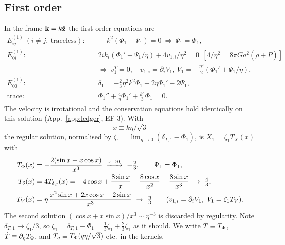 \subsection{First order}
\label{sec:first}
In the frame $\mathbf k=k\hat{\mathbf z}$ the first-order equations are
\begin{align}
E^{(1)}_{ij}\ (i\neq j,\ \text{traceless}):&\quad -k^2(\Phi_1-\Psi_1)=0\ \Rightarrow\ \Psi_1=\Phi_1,\nonumber\\
E^{(1)}_{0i}:&\quad 2ik_i(\Phi_1'+\Psi_1/\eta)+4v_{1,i}/\eta^2=0\ \ [4/\eta^2=8\pi Ga^2(\bar\rho+\bar P)]\nonumber\\
&\quad\Rightarrow\ v^T_{1}=0,\quad v_{1,i}=\partial_iV_1,\ V_1=-\tfrac{\eta^2}2(\Phi_1'+\Psi_1/\eta),\nonumber\\
E^{(1)}_{00}:&\quad \delta_1=-\tfrac23\eta^2k^2\Phi_1-2\eta\Phi_1'-2\Psi_1,\nonumber\\
\text{trace}:&\quad \Phi_1''+\tfrac4\eta\Phi_1'+\tfrac{k^2}3\Phi_1=0 .
\label{eq:first_eqs}
\end{align}
The velocity is irrotational and the conservation equations hold identically on this solution
(App.~\ref{app:ledger}, EF-3).  With
\begin{equation}
x\equiv k\eta/\sqrt3
\label{eq:x}
\end{equation}
the regular solution, normalised by $\zeta_1=\lim_{\eta\to0}(\delta_{T,1}-\Phi_1)$, is $X_1=\zeta_1T_X(x)$ with
\begin{align}
\TP(x)&=-\frac{2(\sin x-x\cos x)}{x^3}\ \xrightarrow{x\to0}\ -\tfrac23,\qquad \Psi_1=\Phi_1,\nonumber\\
T_\delta(x)&=4T_{\delta_T}(x)=-4\cos x+\frac{8\sin x}{x}+\frac{8\cos x}{x^2}-\frac{8\sin x}{x^3}\ \to\ \tfrac43,\nonumber\\
T_V(x)&=\eta\,\frac{x^2\sin x+2x\cos x-2\sin x}{x^3}\ \to\ \tfrac\eta3\qquad(v_{1,i}=\partial_iV_1,\ V_{1}=\zeta_1T_V).
\label{eq:transfer}
\end{align}
The second solution $(\cos x+x\sin x)/x^3\sim\eta^{-3}$ is discarded by regularity.  Note $\delta_{T,1}\to\zeta_1/3$,
so $\zeta_1=\delta_{T,1}-\Phi_1=\tfrac13\zeta_1+\tfrac23\zeta_1$ as it should.  We write
$T\equiv T_\Phi$, $\dot T\equiv\partial_\eta T_\Phi$, and $T_q\equiv T_\Phi(q\eta/\sqrt3)$ etc.\ in the kernels.

